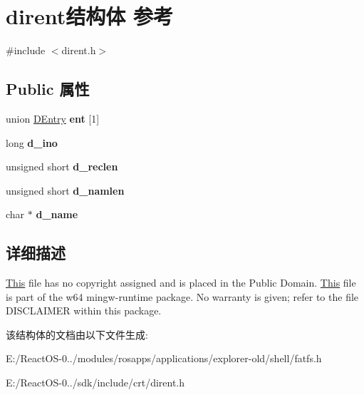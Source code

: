 \hypertarget{structdirent}{}\section{dirent结构体 参考}
\label{structdirent}


{\ttfamily \#include $<$dirent.\+h$>$}

\subsection*{Public 属性}
\begin{DoxyCompactItemize}
\item 
\mbox{\label{structdirent_ac241105de67e7e76627008b7ab076473}} 
union \hyperlink{union_d_entry}{D\+Entry} {\bfseries ent} \mbox{[}1\mbox{]}
\item 
\mbox{\label{structdirent_acb6fecfb0e0f6fdc226dff8d56c3da4a}} 
long {\bfseries d\+\_\+ino}
\item 
\mbox{\label{structdirent_a90dc47836e8ef510437317876368859e}} 
unsigned short {\bfseries d\+\_\+reclen}
\item 
\mbox{\label{structdirent_a383442cd96a79cdb5cdc8bc91080099e}} 
unsigned short {\bfseries d\+\_\+namlen}
\item 
\mbox{\label{structdirent_ab703007dd91aa1f311cf0fc85268b2e1}} 
char $\ast$ {\bfseries d\+\_\+name}
\end{DoxyCompactItemize}


\subsection{详细描述}
\hyperlink{namespace_this}{This} file has no copyright assigned and is placed in the Public Domain. \hyperlink{namespace_this}{This} file is part of the w64 mingw-\/runtime package. No warranty is given; refer to the file D\+I\+S\+C\+L\+A\+I\+M\+ER within this package. 

该结构体的文档由以下文件生成\+:\begin{DoxyCompactItemize}
\item 
E\+:/\+React\+O\+S-\/0../modules/rosapps/applications/explorer-\/old/shell/fatfs.\+h\item 
E\+:/\+React\+O\+S-\/0../sdk/include/crt/dirent.\+h\end{DoxyCompactItemize}

